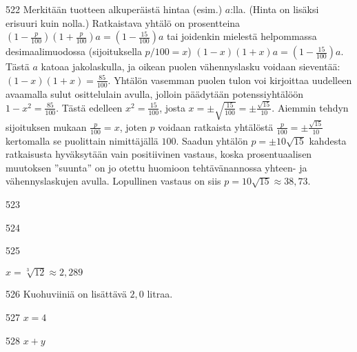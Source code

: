 \begin{Vastaus}{522}
	Merkitään tuotteen alkuperäistä hintaa (esim.) $a$:lla. (Hinta on lisäksi erisuuri kuin nolla.) Ratkaistava yhtälö on prosentteina $(1-\frac{p}{100})(1+\frac{p}{100})a=(1-\frac{15}{100})a$ tai joidenkin mielestä helpommassa desimaalimuodossa (sijoituksella $p/100=x$) $(1-x)(1+x)a=(1-\frac{15}{100})a$. Tästä $a$ katoaa jakolaskulla, ja oikean puolen vähennyslasku voidaan sieventää: $(1-x)(1+x)=\frac{85}{100}$. Yhtälön vasemman puolen tulon voi kirjoittaa uudelleen avaamalla sulut osittelulain avulla, jolloin päädytään potenssiyhtälöön $1-x^2=\frac{85}{100}$. Tästä edelleen $x^2=\frac{15}{100}$, josta $x=\pm \sqrt{\frac{15}{100}}=\pm \frac{\sqrt{15}}{10}$. Aiemmin tehdyn sijoituksen mukaan $\frac{p}{100}=x$, joten $p$ voidaan ratkaista yhtälöstä $\frac{p}{100}=\pm \frac{\sqrt{15}}{10}$ kertomalla se puolittain nimittäjällä $100$. Saadun yhtälön $p=\pm 10\sqrt{15}$ kahdesta ratkaisusta hyväksytään vain positiivinen vastaus, koska prosentuaalisen muutoksen ''suunta'' on jo otettu huomioon tehtävänannossa yhteen- ja vähennyslaskujen avulla. Lopullinen vastaus on siis $p=10\sqrt{15}\approx 38,73$.
	
\end{Vastaus}
\begin{Vastaus}{523}
	
\end{Vastaus}
\begin{Vastaus}{524}
    
\end{Vastaus}
\begin{Vastaus}{525}

$x=\sqrt[3]{12}\approx2,289$

    
\end{Vastaus}
\begin{Vastaus}{526}
	    Kuohuviiniä on lisättävä $2,0$ litraa.
    
\end{Vastaus}
\begin{Vastaus}{527}
	$x=4$
	
\end{Vastaus}
\begin{Vastaus}{528}
		$x+y$
		
\end{Vastaus}
